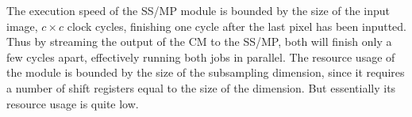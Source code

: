 The execution speed of the SS/MP module is bounded by the size of the input image, $ c \times c $ clock cycles, finishing one cycle after the last pixel has been inputted. 
Thus by streaming the output of the CM to the SS/MP, both will finish only a few cycles apart, effectively running both jobs in parallel. The resource usage of the module is bounded by the size of the subsampling dimension, since it requires a number of shift registers equal to the size of the dimension. But essentially its resource usage is quite low.  
